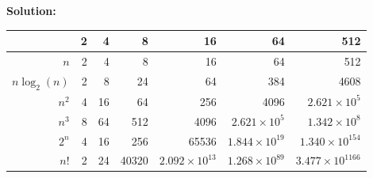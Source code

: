 \documentclass[]{article}
\newcommand{\solution}{\vskip 0.5cm \textbf{\large Solution:} \\}
\begin{document}
\begin{enumerate}[resume]
	  \solution
      \begin{center}
      \begin{tabular}{|r||r|r|r|r|r|r|}
        \hline
        & 2 & 4 & 8 & 16 & 64 & 512 \\
        \hline
        \hline
        $n$ & 2 & 4 & 8 & 16 & 64 & 512 \\
        \hline
        $n\log_2(n)$ & 2 & 8 & 24 & 64 & 384 & 4608 \\
        \hline
        $n^2$ & 4 & 16 & 64 & 256 & 4096 & $2.621 \times 10^{5}$ \\
        \hline
        $n^3$ & 8 & 64 & 512 & 4096 & $2.621 \times 10^{5}$ & $1.342 \times 10^{8}$ \\
        \hline
        $2^n$ & 4 & 16 & 256 & 65536 & $1.844 \times 10^{19}$ & $1.340 \times 10^{154}$ \\
        \hline
        $n!$ & 2 & 24 & 40320 & $2.092 \times 10^{13}$ & $1.268 \times 10^{89}$ & $3.477 \times 10^{1166}$ \\
        \hline
      \end{tabular}
      \end{center}
    \end{enumerate}
\end{document}
